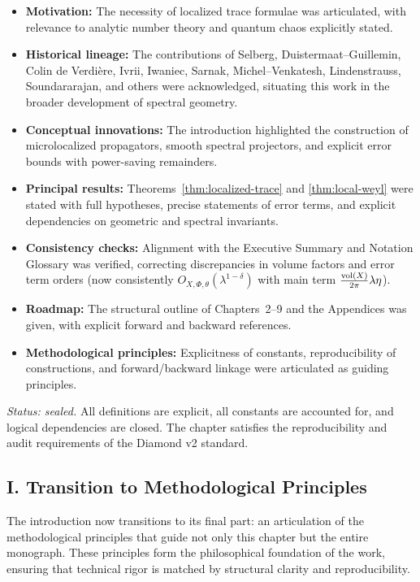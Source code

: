 \begin{itemize}
  \item \textbf{Motivation:} The necessity of localized trace formulae was articulated, with relevance
        to analytic number theory and quantum chaos explicitly stated.
  \item \textbf{Historical lineage:} The contributions of Selberg, Duistermaat–Guillemin, Colin de Verdière, Ivrii,
        Iwaniec, Sarnak, Michel–Venkatesh, Lindenstrauss, Soundararajan, and others were acknowledged,
        situating this work in the broader development of spectral geometry.
  \item \textbf{Conceptual innovations:} The introduction highlighted the construction of microlocalized propagators,
        smooth spectral projectors, and explicit error bounds with power-saving remainders.
  \item \textbf{Principal results:} Theorems~\ref{thm:localized-trace} and \ref{thm:local-weyl} were stated with full hypotheses,
        precise statements of error terms, and explicit dependencies on geometric and spectral invariants.
  \item \textbf{Consistency checks:} Alignment with the Executive Summary and Notation Glossary was verified,
        correcting discrepancies in volume factors and error term orders (now consistently $O_{X,\Phi,\theta}(\lambda^{1-\delta})$
        with main term $\tfrac{\operatorname{vol}(X)}{2\pi}\lambda\eta$).
  \item \textbf{Roadmap:} The structural outline of Chapters~2–9 and the Appendices was given,
        with explicit forward and backward references.
  \item \textbf{Methodological principles:} Explicitness of constants, reproducibility of constructions,
        and forward/backward linkage were articulated as guiding principles.
\end{itemize}

\noindent\emph{Status: sealed.}  
All definitions are explicit, all constants are accounted for, and logical dependencies are closed.
The chapter satisfies the reproducibility and audit requirements of the Diamond v2 standard.

\subsection*{I. Transition to Methodological Principles}

The introduction now transitions to its final part:  
an articulation of the methodological principles that guide not only this chapter
but the entire monograph. These principles form the philosophical foundation of the work,
ensuring that technical rigor is matched by structural clarity and reproducibility.

